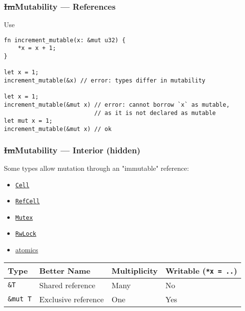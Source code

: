 \documentclass[t]{beamer}
\begin{document}
\begin{frame}[c,fragile]
\frametitle{\st{Im}Mutability --- References}

\begin{block}{Use}
\small
\begin{verbatim}
fn increment_mutable(x: &mut u32) {
    *x = x + 1;
}

let x = 1;
increment_mutable(&x) // error: types differ in mutability

let x = 1;
increment_mutable(&mut x) // error: cannot borrow `x` as mutable,
                          // as it is not declared as mutable
let mut x = 1;
increment_mutable(&mut x) // ok
\end{verbatim}
\end{block}

\end{frame}


\begin{frame}[fragile]
\frametitle{\st{Im}Mutability --- Interior (hidden)}

Some types allow mutation through an "immutable" reference:

\begin{itemize}
\item \href{https://doc.rust-lang.org/std/cell/struct.Cell.html}{\texttt{Cell}}
\item \href{https://doc.rust-lang.org/std/cell/struct.RefCell.html}{\texttt{RefCell}}
\item \href{https://doc.rust-lang.org/std/sync/struct.Mutex.html}{\texttt{Mutex}}
\item \href{https://doc.rust-lang.org/std/sync/struct.RwLock.html}{\texttt{RwLock}}
\item \href{https://doc.rust-lang.org/std/sync/atomic/}{atomics}
\end{itemize}

\bigskip

\begin{tabular}{l l l l}
Type & Better Name & Multiplicity & Writable (\texttt{*x = ..}) \\
\hline
{}\texttt{\&T} & Shared reference & Many & No \\
\texttt{\&mut T} & Exclusive reference & One & Yes
\end{tabular}

\end{frame}
\end{document}
